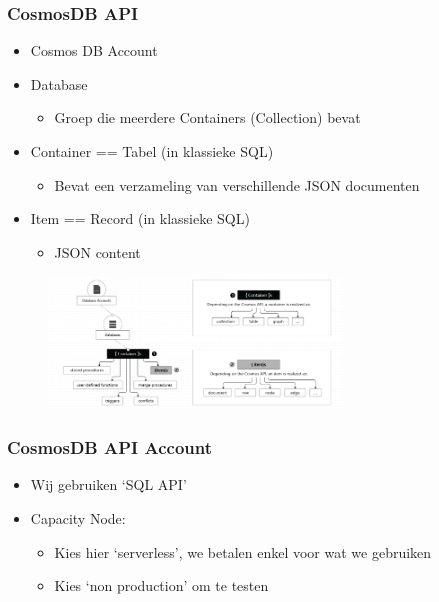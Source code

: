 \documentclass{article}
\begin{document}
\subsubsection{CosmosDB API}

\begin{itemize}
    \item Cosmos DB Account
    \item Database
    \begin{itemize}
        \item Groep die meerdere Containers (Collection) bevat
    \end{itemize} 
    \item Container == Tabel (in klassieke SQL)
    \begin{itemize}
        \item Bevat een verzameling van verschillende JSON documenten
    \end{itemize}
    \item Item == Record (in klassieke SQL)
    \begin{itemize}
        \item JSON content
    \end{itemize}
\end{itemize}

\begin{figure}[H]
    \centering
    \includegraphics[width=0.7\textwidth]{cosmosdb-api.png}
    \caption{}
\end{figure}

\subsubsection{CosmosDB API Account}

\begin{itemize}
    \item Wij gebruiken `SQL API'
    \item Capacity Node:
    \begin{itemize}
        \item Kies hier `serverless', we betalen enkel voor wat we gebruiken
        \item Kies `non production' om te testen
    \end{itemize}
\end{itemize}
\end{document}
